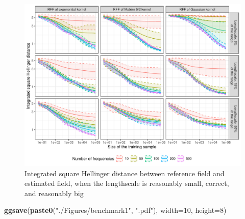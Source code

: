 \documentclass[
]{article}
\newenvironment{Shaded}{\begin{snugshade}}{\end{snugshade}}
\newcommand{\AttributeTok}[1]{\textcolor[rgb]{0.13,0.29,0.53}{#1}}
\newcommand{\DecValTok}[1]{\textcolor[rgb]{0.00,0.00,0.81}{#1}}
\newcommand{\FunctionTok}[1]{\textcolor[rgb]{0.13,0.29,0.53}{\textbf{#1}}}
\newcommand{\NormalTok}[1]{#1}
\newcommand{\StringTok}[1]{\textcolor[rgb]{0.31,0.60,0.02}{#1}}
\begin{document}
\begin{figure}[H]

{\centering \includegraphics{IntroductionSLGP_files/figure-latex/PlotOtherLen-1} 

}

\caption{Integrated square Hellinger distance between reference field and estimated field, when the lengthscale is reasonably small, correct, and reasonably big}\label{fig:PlotOtherLen}
\end{figure}

\begin{Shaded}
\begin{Highlighting}[]
\FunctionTok{ggsave}\NormalTok{(}\FunctionTok{paste0}\NormalTok{(}\StringTok{"./Figures/benchmark1"}\NormalTok{,  }\StringTok{".pdf"}\NormalTok{), }\AttributeTok{width=}\DecValTok{10}\NormalTok{, }\AttributeTok{height=}\DecValTok{8}\NormalTok{)}
\end{Highlighting}
\end{Shaded}
\end{document}
